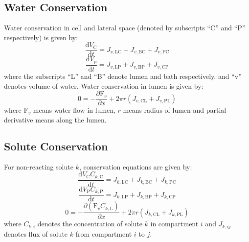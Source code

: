 \documentclass{article}
\begin{document}
\subsection{Water Conservation}
Water conservation in cell and lateral space (denoted by subscripts ``C'' and ``P'' respectively) is given by:\\
\begin{equation}
\frac{\mathrm{d} V_{\mathrm{C}}}{\mathrm{d} t}=J_{v, \mathrm{LC}}+J_{v, \mathrm{BC}}+J_{v, \mathrm{PC}}
\end{equation}
\begin{equation}
\frac{\mathrm{d} V_{\mathrm{p}}}{\mathrm{d} t}=J_{v, \mathrm{LP}}+J_{v, \mathrm{BP}}+J_{v, \mathrm{CP}}
\end{equation}
where the subscripts ``L'' and ``B'' denote lumen and bath respectively, and ``v'' denotes volume of water. Water conservation in lumen is given by:
\begin{equation}
0=-\frac{\partial \mathrm{F}_{v}}{\partial x}+2 \pi r (J_{v,\mathrm{CL}}+J_{v,\mathrm{PL}})
\end{equation}
where $\mathrm{F}_{v}$ means water flow in lumen, $r$ means radius of lumen and partial derivative means along the lumen.

\subsection{Solute Conservation}
For non-reacting solute $k$, conservation equations are given by:
\begin{equation}
\frac{\mathrm{d} V_{\mathrm{C}} C_{k, \mathrm{C}}}{\mathrm{d} t}=J_{k, \mathrm{LC}}+J_{k, \mathrm{BC}}+J_{k, \mathrm{PC}}
\end{equation}
\begin{equation}
\frac{\mathrm{d} V_{\mathrm{P}} C_{k, \mathrm{P}}}{\mathrm{d} t}=J_{k, \mathrm{LP}}+J_{k, \mathrm{BP}}+J_{k, \mathrm{CP}}
\end{equation}
\begin{equation}
0=-\frac{\partial\left(\mathrm{F}_{v} C_{k,\mathrm{L}}\right)}{\partial x}+2 \pi r (J_{k,\mathrm{CL}}+J_{k,\mathrm{PL}})
\end{equation}
where $C_{k,i}$ denotes the concentration of solute $k$ in compartment $i$ and $J_{k,ij}$ denotes flux of solute $k$ from compartment $i$ to $j$.\\
\end{document}
